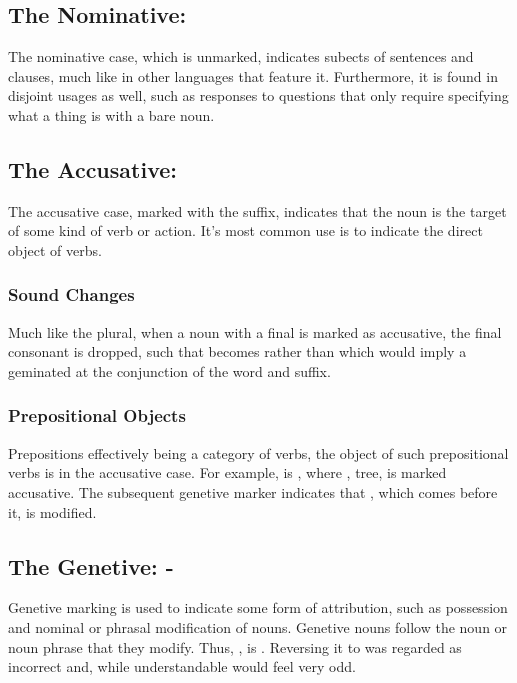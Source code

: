 \subsection{The Nominative: \textbf{\suffixtext{\varnothing}}}
The nominative case, which is unmarked, indicates subects of sentences and clauses, much like in other languages that feature it. Furthermore, it is found in disjoint usages as well, such as responses to questions that only require specifying what a thing is with a bare noun.

\subsection{The Accusative: \textbf{\suffixtext{\acc}}}
The accusative case, marked with the \suffixtext{\acc} suffix, indicates that the noun is the target of some kind of verb or action. It's most common use is to indicate the direct object of verbs.
  \subsubsection{Sound Changes}
  Much like the plural, when a noun with a final  is marked as accusative, the final consonant is dropped, such that  becomes  rather than  which would imply a geminated  at the conjunction of the word and suffix.
  \subsubsection{Prepositional Objects}
  Prepositions effectively being a category of verbs, the object of such prepositional verbs is in the accusative case. For example,  is , where , tree, is marked accusative. The subsequent genetive marker indicates that , which comes before it, is modified.

\subsection{The Genetive: \textbf{-\gen}}
Genetive marking is used to indicate some form of attribution, such as possession and nominal or phrasal modification of nouns. Genetive nouns follow the noun or noun phrase that they modify. Thus, , is . Reversing it to  was regarded as incorrect and, while understandable would feel very odd.

